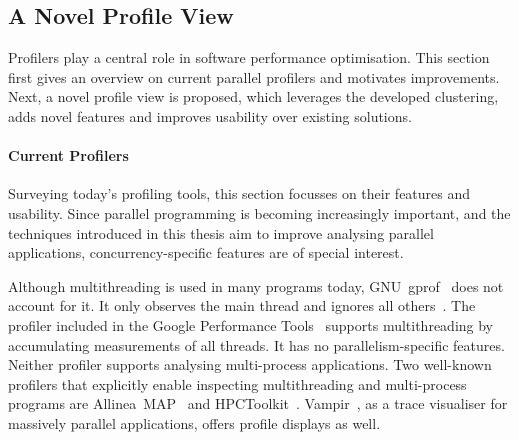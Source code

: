 \documentclass[a4paper, final, diplominf]{zih-template}
\begin{document}
\subsection{A Novel Profile View}
\label{sec:evaluation-visualisations-new}
Profilers play a central role in software performance optimisation.
This section first gives an overview on current parallel profilers and motivates improvements.
Next, a novel profile view is proposed, which leverages the developed clustering, adds novel features and improves usability over existing solutions.

\paragraph{Current Profilers}
\label{sec:evaluation-visualisations-new-current}
Surveying today's profiling tools, this section focusses on their features and usability.
Since parallel programming is becoming increasingly important, and the techniques introduced in this thesis aim to improve analysing parallel applications, concurrency-specific features are of special interest.

Although multithreading is used in many programs today, GNU~gprof~\cite{graham82} does not account for it.
It only observes the main thread and ignores all others~\cite{gprof-multithreading}.
The profiler included in the Google Performance Tools~\cite{googleperftools} supports multithreading by accumulating measurements of all threads.
It has no parallelism-specific features.
Neither profiler supports analysing multi-process applications.
Two well-known profilers that explicitly enable inspecting multithreading and multi-process programs are Allinea~MAP~\cite{allineamap} and HPCToolkit~\cite{adhianto10}.
Vampir~\cite{knuepfer08b}, as a trace visualiser for massively parallel applications, offers profile displays as well.
\end{document}
